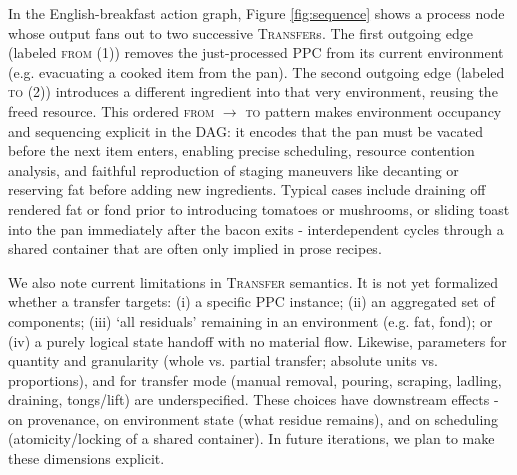 \documentclass[sigconf]{acmart}
\begin{document}
In the English-breakfast action graph, Figure \ref{fig:sequence} shows a process node whose output fans out to two successive \textsc{Transfer}s. The first outgoing edge (labeled \textsc{from (1)}) removes the just-processed PPC from its current environment (e.g. evacuating a cooked item from the pan). The second outgoing edge (labeled \textsc{to (2)}) introduces a different ingredient into that very environment, reusing the freed resource. This ordered \textsc{from} $\to$ \textsc{to} pattern makes environment occupancy and sequencing explicit in the DAG: it encodes that the pan must be vacated before the next item enters, enabling precise scheduling, resource contention analysis, and faithful reproduction of staging maneuvers like decanting or reserving fat before adding new ingredients. Typical cases include draining off rendered fat or fond prior to introducing tomatoes or mushrooms, or sliding toast into the pan immediately after the bacon exits - interdependent cycles through a shared container that are often only implied in prose recipes.

We also note current limitations in \textsc{Transfer} semantics. It is not yet formalized whether a transfer targets: (i) a specific PPC instance; (ii) an aggregated set of components; (iii) `all residuals' remaining in an environment (e.g. fat, fond); or (iv) a purely logical state handoff with no material flow. Likewise, parameters for quantity and granularity (whole vs. partial transfer; absolute units vs. proportions), and for transfer mode (manual removal, pouring, scraping, ladling, draining, tongs/lift) are underspecified. These choices have downstream effects - on provenance, on environment state (what residue remains), and on scheduling (atomicity/locking of a shared container). In future iterations, we plan to make these dimensions explicit.
\end{document}

